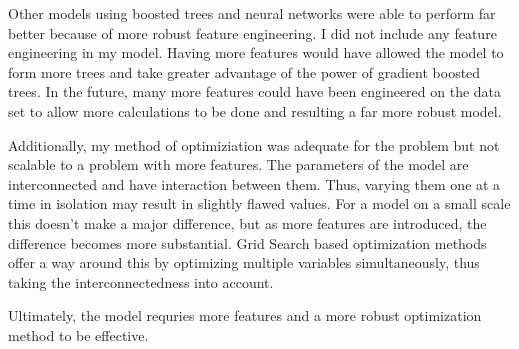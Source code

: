 \documentclass[12pt]{article}
\begin{document}
    Other models using boosted trees and neural networks were able to perform far better because of more robust feature engineering. I did not include any feature engineering in my model. Having more features would have allowed the model to form more trees and take greater advantage of the power of gradient boosted trees. In the future, many more features could have been engineered on the data set to allow more calculations to be done and resulting a far more robust model.

    Additionally, my method of optimiziation was adequate for the problem but not scalable to a problem with more features. The parameters of the model are interconnected and have interaction between them. Thus, varying them one at a time in isolation may result in slightly flawed values. For a model on a small scale this doesn't make a major difference, but as more features are introduced, the difference becomes more substantial. Grid Search based optimization methods offer a way around this by optimizing multiple variables simultaneously, thus taking the interconnectedness into account.

    Ultimately, the model requries more features and a more robust optimization method to be effective.
  {}
  
\end{document}
